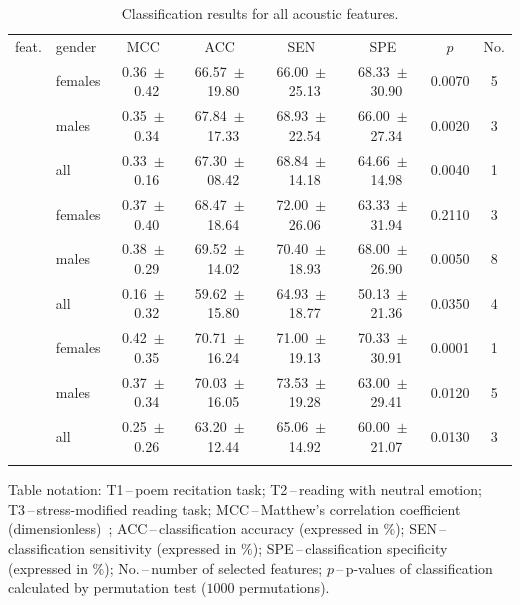 \begin{table}[htb!]
	\centering
	\begin{threeparttable}
		\caption{Classification results for all acoustic features.}
		\label{tab:ch4_classification_combination}
		\footnotesize
		\centering
		\begin{tabular}{c l c c c c c c} 
		
			\hline\hline\noalign{\smallskip}
			\rowcolor{gray_table}
			feat. & gender & MCC & ACC & SEN & SPE & $p$ & No. \\
			\noalign{\smallskip}\hline\noalign{\smallskip}

			\multirow{3}{*}{T1} &
			  females & 0.36~$\pm$~0.42 & 66.57~$\pm$~19.80 & 66.00~$\pm$~25.13 & 68.33~$\pm$~30.90 & 0.0070 & 5 \\
			& males   & 0.35~$\pm$~0.34 & 67.84~$\pm$~17.33 & 68.93~$\pm$~22.54 & 66.00~$\pm$~27.34 & 0.0020 & 3 \\
			& all     & 0.33~$\pm$~0.16 & 67.30~$\pm$~08.42 & 68.84~$\pm$~14.18 & 64.66~$\pm$~14.98 & 0.0040 & 1 \\
			\noalign{\smallskip}

			\multirow{3}{*}{T2} &
			  females & 0.37~$\pm$~0.40 & 68.47~$\pm$~18.64 & 72.00~$\pm$~26.06 & 63.33~$\pm$~31.94 & 0.2110 & 3 \\
			& males   & 0.38~$\pm$~0.29 & 69.52~$\pm$~14.02 & 70.40~$\pm$~18.93 & 68.00~$\pm$~26.90 & 0.0050 & 8 \\
			& all     & 0.16~$\pm$~0.32 & 59.62~$\pm$~15.80 & 64.93~$\pm$~18.77 & 50.13~$\pm$~21.36 & 0.0350 & 4 \\
			\noalign{\smallskip}

			\multirow{3}{*}{T3} &
			  females & 0.42~$\pm$~0.35 & 70.71~$\pm$~16.24 & 71.00~$\pm$~19.13 & 70.33~$\pm$~30.91 & 0.0001 & 1 \\
			& males   & 0.37~$\pm$~0.34 & 70.03~$\pm$~16.05 & 73.53~$\pm$~19.28 & 63.00~$\pm$~29.41 & 0.0120 & 5 \\
			& all     & 0.25~$\pm$~0.26 & 63.20~$\pm$~12.44 & 65.06~$\pm$~14.92 & 60.00~$\pm$~21.07 & 0.0130 & 3 \\	

			\noalign{\smallskip}\hline\hline
		\end{tabular}
				
		\begin{tablenotes}
			\scriptsize
			\item Table notation: T1\,--\,poem recitation task; T2\,--\,reading with neutral emotion; T3\,--\,stress-modified reading task; MCC\,--\,Matthew's correlation coefficient (dimensionless)~\cite{Matthews1975}; ACC\,--\,classification accuracy (expressed in $\%$); SEN\,--\,classification sensitivity (expressed in $\%$); SPE\,--\,classification specificity (expressed in $\%$); No.\,--\,number of selected features; $p$\,--\,p-values of classification calculated by permutation test ($1000$ permutations).
		\end{tablenotes}
	\end{threeparttable}
\end{table}

